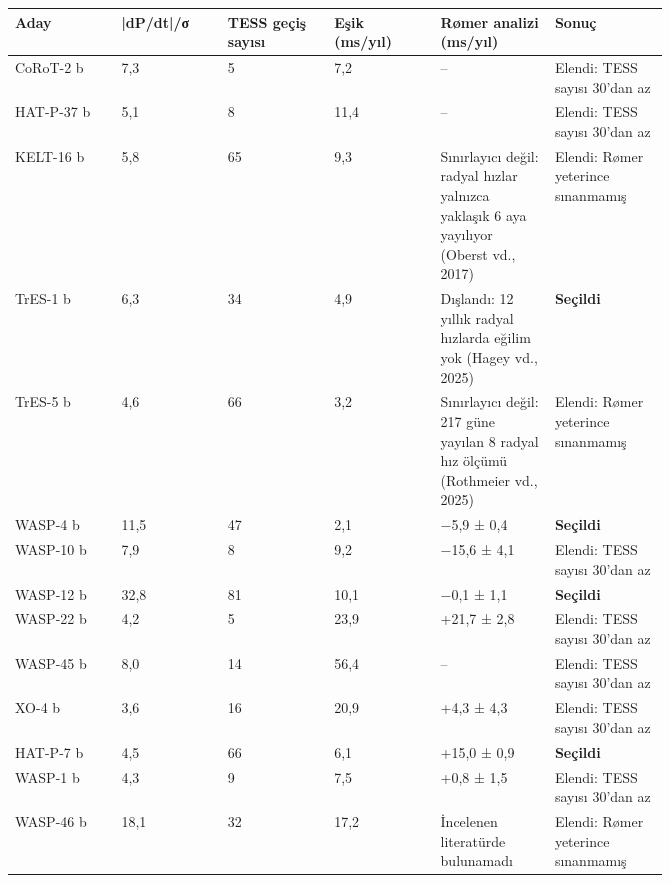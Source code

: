 {\footnotesize\begin{longtable}{|p{0.127\linewidth}|p{0.127\linewidth}|p{0.127\linewidth}|p{0.127\linewidth}|p{0.127\linewidth}|p{0.127\linewidth}|}\hline
\textbf{Aday} & \textbf{|dP/dt|/σ} & \textbf{TESS geçiş sayısı} & \textbf{Eşik (ms/yıl)} & \textbf{Rømer analizi (ms/yıl)} & \textbf{Sonuç}\\\hline\endhead
CoRoT-2 b & 7,3 & 5 & 7,2 & – & Elendi: TESS sayısı 30'dan az\\\hline
HAT-P-37 b & 5,1 & 8 & 11,4 & – & Elendi: TESS sayısı 30'dan az\\\hline
KELT-16 b & 5,8 & 65 & 9,3 & Sınırlayıcı değil: radyal hızlar yalnızca yaklaşık 6 aya yayılıyor (Oberst vd., 2017) & Elendi: Rømer yeterince sınanmamış\\\hline
TrES-1 b & 6,3 & 34 & 4,9 & Dışlandı: 12 yıllık radyal hızlarda eğilim yok (Hagey vd., 2025) & \textbf{Seçildi}\\\hline
TrES-5 b & 4,6 & 66 & 3,2 & Sınırlayıcı değil: 217 güne yayılan 8 radyal hız ölçümü (Rothmeier vd., 2025) & Elendi: Rømer yeterince sınanmamış\\\hline
WASP-4 b & 11,5 & 47 & 2,1 & −5,9 ± 0,4 & \textbf{Seçildi}\\\hline
WASP-10 b & 7,9 & 8 & 9,2 & −15,6 ± 4,1 & Elendi: TESS sayısı 30'dan az\\\hline
WASP-12 b & 32,8 & 81 & 10,1 & −0,1 ± 1,1 & \textbf{Seçildi}\\\hline
WASP-22 b & 4,2 & 5 & 23,9 & +21,7 ± 2,8 & Elendi: TESS sayısı 30'dan az\\\hline
WASP-45 b & 8,0 & 14 & 56,4 & – & Elendi: TESS sayısı 30'dan az\\\hline
XO-4 b & 3,6 & 16 & 20,9 & +4,3 ± 4,3 & Elendi: TESS sayısı 30'dan az\\\hline
HAT-P-7 b & 4,5 & 66 & 6,1 & +15,0 ± 0,9 & \textbf{Seçildi}\\\hline
WASP-1 b & 4,3 & 9 & 7,5 & +0,8 ± 1,5 & Elendi: TESS sayısı 30'dan az\\\hline
WASP-46 b & 18,1 & 32 & 17,2 & İncelenen literatürde bulunamadı & Elendi: Rømer yeterince sınanmamış\\\hline
\end{longtable}}
